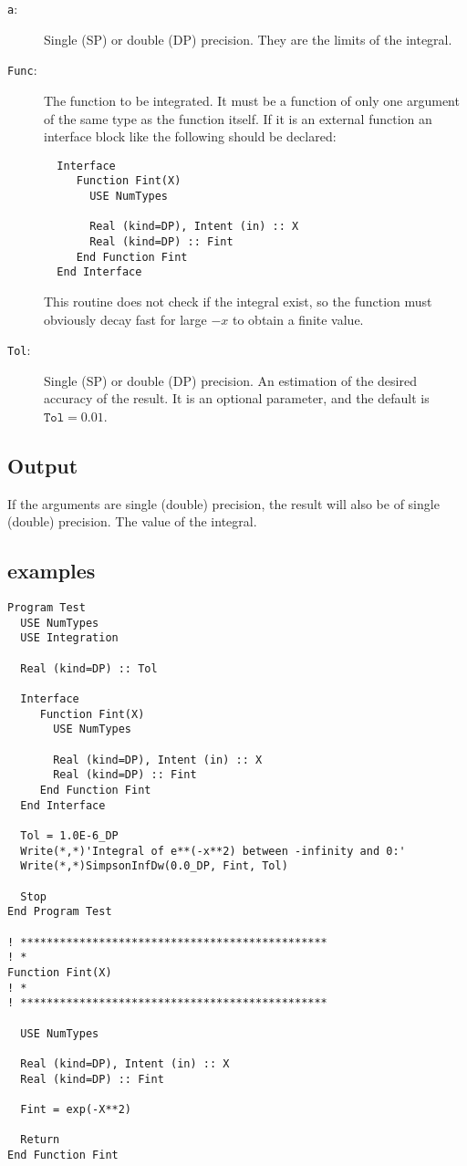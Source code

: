 \begin{description}
\item[\texttt{a}:] Single (SP) or double (DP) precision. They are
  the limits of the integral.
\item[\texttt{Func}:] The function to be integrated. It must be a
  function of only one argument of the same type as the function
  itself. If it is an
  external function an interface block like the following should be
  declared: 
\begin{verbatim}
  Interface 
     Function Fint(X)
       USE NumTypes

       Real (kind=DP), Intent (in) :: X
       Real (kind=DP) :: Fint
     End Function Fint
  End Interface
\end{verbatim}
  This routine does not check if the integral exist, so the function
  must obviously decay fast for large $-x$ to obtain a finite value.
\item[\texttt{Tol}:] Single (SP) or double (DP) precision. An
  estimation of the desired accuracy of the result. It is an optional
  parameter, and the default is $\mathtt{Tol} = 0.01$. 
\end{description}


\subsection{Output}

If the arguments are single (double) precision, the result will also be of
single (double) precision. The value of the integral.


\subsection{examples}

\begin{lstlisting}[emph=SimpsonInfDW,
                   emphstyle=\color{blue},
                   frame=trBL,
                   caption=Integrating a function between $-\infty$
                   and 0.,
                   label=simpsoninfdw]
Program Test
  USE NumTypes
  USE Integration

  Real (kind=DP) :: Tol

  Interface 
     Function Fint(X)
       USE NumTypes

       Real (kind=DP), Intent (in) :: X
       Real (kind=DP) :: Fint
     End Function Fint
  End Interface

  Tol = 1.0E-6_DP
  Write(*,*)'Integral of e**(-x**2) between -infinity and 0:'
  Write(*,*)SimpsonInfDw(0.0_DP, Fint, Tol)

  Stop
End Program Test

! ***********************************************
! *
Function Fint(X)
! *  
! ***********************************************

  USE NumTypes

  Real (kind=DP), Intent (in) :: X
  Real (kind=DP) :: Fint

  Fint = exp(-X**2)

  Return
End Function Fint
\end{lstlisting}

